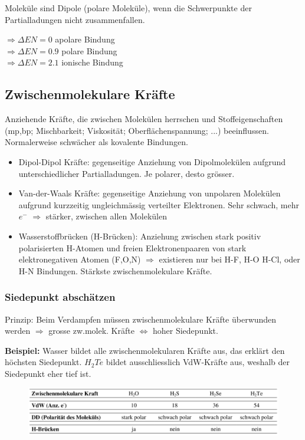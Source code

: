 Moleküle sind Dipole (polare Moleküle), wenn die Schwerpunkte der Partialladungen nicht zusammenfallen.

 $\Rightarrow \Delta EN=0$ apolare Bindung \\
 $\Rightarrow \Delta EN=0.9$ polare Bindung \\
 $\Rightarrow \Delta EN=2.1$ ionische Bindung 

\subsection{Zwischenmolekulare Kräfte}
Anziehende Kräfte, die zwischen Molekülen herrschen und Stoffeigenschaften (mp,bp; Mischbarkeit; Viskosität; Oberflächenspannung; ...) beeinflussen. Normalerweise schwächer als kovalente Bindungen.

\begin{itemize}
	\item Dipol-Dipol Kräfte: gegenseitige Anziehung von Dipolmolekülen aufgrund unterschiedlicher Partialladungen. Je polarer, desto grösser.
	\item Van-der-Waals Kräfte: gegenseitige Anziehung von unpolaren Molekülen aufgrund kurzzeitig ungleichmässig verteilter Elektronen. Sehr schwach, mehr $e^-$ $\Rightarrow$ stärker, zwischen allen Molekülen
	\item Wasserstoffbrücken (H-Brücken): Anziehung zwischen stark positiv polarisierten H-Atomen und freien Elektronenpaaren von stark elektronegativen Atomen (F,O,N) $\Rightarrow$ existieren nur bei H-F, H-O H-Cl, oder H-N Bindungen. Stärkste zwischenmolekulare Kräfte.
\end{itemize}

\subsubsection{Siedepunkt abschätzen}
Prinzip: Beim Verdampfen müssen zwischenmolekulare Kräfte überwunden werden $\Rightarrow$ grosse zw.molek. Kräfte $\Leftrightarrow$ hoher Siedepunkt. 

\textbf{Beispiel:} Wasser bildet alle zwischenmolekularen Kräfte aus, das erklärt den höchsten Siedepunkt. $H_2Te$ bildet ausschliesslich VdW-Kräfte aus, weshalb der Siedepunkt eher tief ist.
\begin{figure}[htbp]
	\centering
	\includegraphics[width=1\linewidth]{images/5_Siedepunkt.png}
\end{figure}

